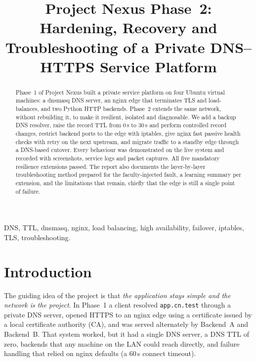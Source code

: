 \documentclass[conference,a4paper]{IEEEtran}
\newcommand{\cmd}[1]{\texttt{\small #1}}
\begin{document}
\title{Project Nexus Phase~2: Hardening, Recovery and Troubleshooting of a Private DNS--HTTPS Service Platform}

\author{
}

\maketitle

\begin{abstract}
Phase~1 of Project Nexus built a private service platform on four Ubuntu virtual machines: a dnsmasq DNS server,
an nginx edge that terminates TLS and load-balances, and two Python HTTP backends. Phase~2 extends the same network,
without rebuilding it, to make it resilient, isolated and diagnosable. We add a backup DNS resolver, raise the record
TTL from 0\,s to 30\,s and perform controlled record changes, restrict backend ports to the edge with iptables, give
nginx fast passive health checks with retry on the next upstream, and migrate traffic to a standby edge through a
DNS-based cutover. Every behaviour was demonstrated on the live system and recorded with screenshots, service logs and
packet captures. All five mandatory resilience extensions passed. The report also documents the layer-by-layer
troubleshooting method prepared for the faculty-injected fault, a learning summary per extension, and the limitations
that remain, chiefly that the edge is still a single point of failure.
\end{abstract}

\begin{IEEEkeywords}
DNS, TTL, dnsmasq, nginx, load balancing, high availability, failover, iptables, TLS, troubleshooting.
\end{IEEEkeywords}

\section{Introduction}
The guiding idea of the project is that \emph{the application stays simple and the network is the project}.
In Phase~1 a client resolved \cmd{app.cn.test} through a private DNS server, opened HTTPS to an nginx edge using a
certificate issued by a local certificate authority (CA), and was served alternately by Backend~A and Backend~B.
That system worked, but it had a single DNS server, a DNS TTL of zero, backends that any machine on the LAN could
reach directly, and failure handling that relied on nginx defaults (a 60\,s connect timeout).
\end{document}
